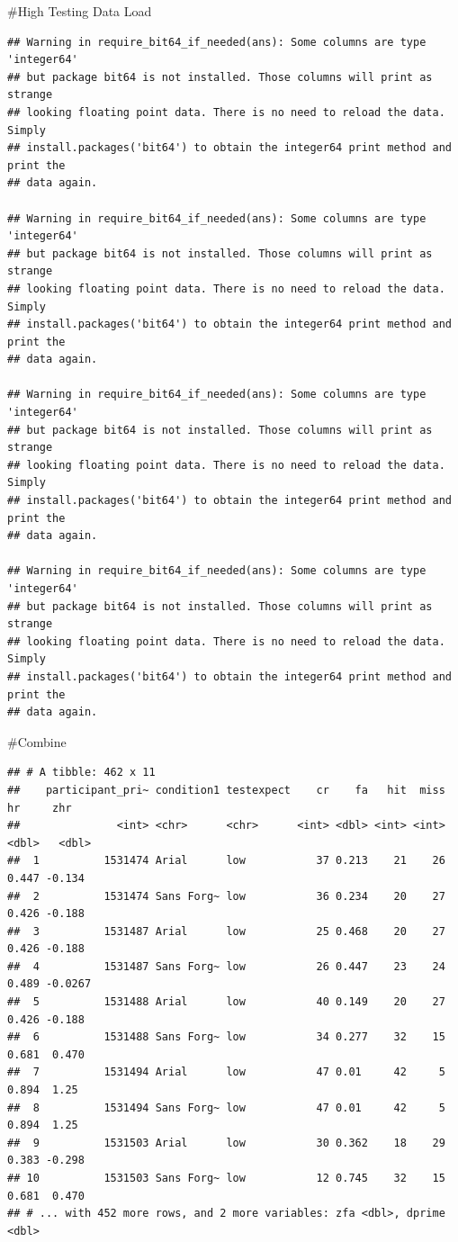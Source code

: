 \documentclass[
  english,
  man]{apa6}
\begin{document}
\#High Testing Data Load

\begin{verbatim}
## Warning in require_bit64_if_needed(ans): Some columns are type 'integer64'
## but package bit64 is not installed. Those columns will print as strange
## looking floating point data. There is no need to reload the data. Simply
## install.packages('bit64') to obtain the integer64 print method and print the
## data again.

## Warning in require_bit64_if_needed(ans): Some columns are type 'integer64'
## but package bit64 is not installed. Those columns will print as strange
## looking floating point data. There is no need to reload the data. Simply
## install.packages('bit64') to obtain the integer64 print method and print the
## data again.

## Warning in require_bit64_if_needed(ans): Some columns are type 'integer64'
## but package bit64 is not installed. Those columns will print as strange
## looking floating point data. There is no need to reload the data. Simply
## install.packages('bit64') to obtain the integer64 print method and print the
## data again.

## Warning in require_bit64_if_needed(ans): Some columns are type 'integer64'
## but package bit64 is not installed. Those columns will print as strange
## looking floating point data. There is no need to reload the data. Simply
## install.packages('bit64') to obtain the integer64 print method and print the
## data again.
\end{verbatim}

\#Combine

\begin{verbatim}
## # A tibble: 462 x 11
##    participant_pri~ condition1 testexpect    cr    fa   hit  miss    hr     zhr
##               <int> <chr>      <chr>      <int> <dbl> <int> <int> <dbl>   <dbl>
##  1          1531474 Arial      low           37 0.213    21    26 0.447 -0.134 
##  2          1531474 Sans Forg~ low           36 0.234    20    27 0.426 -0.188 
##  3          1531487 Arial      low           25 0.468    20    27 0.426 -0.188 
##  4          1531487 Sans Forg~ low           26 0.447    23    24 0.489 -0.0267
##  5          1531488 Arial      low           40 0.149    20    27 0.426 -0.188 
##  6          1531488 Sans Forg~ low           34 0.277    32    15 0.681  0.470 
##  7          1531494 Arial      low           47 0.01     42     5 0.894  1.25  
##  8          1531494 Sans Forg~ low           47 0.01     42     5 0.894  1.25  
##  9          1531503 Arial      low           30 0.362    18    29 0.383 -0.298 
## 10          1531503 Sans Forg~ low           12 0.745    32    15 0.681  0.470 
## # ... with 452 more rows, and 2 more variables: zfa <dbl>, dprime <dbl>
\end{verbatim}
\end{document}
